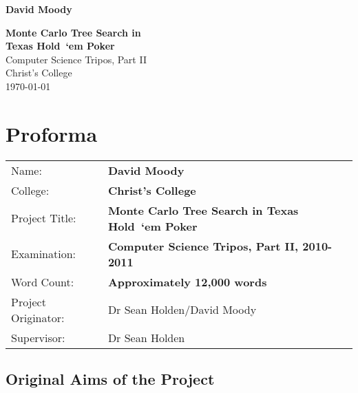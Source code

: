 \documentclass[12pt,twoside,notitlepage]{report}
\newcommand{\texas}{Texas Hold~`em\xspace}
\newcommand{\texasp}{\texas Poker\xspace}
\begin{document}


\pagestyle{empty}

\hfill{\LARGE \bf David Moody}

\vspace*{55mm}
\begin{center}
\Huge
{\bf Monte Carlo Tree Search in \\\texasp} \\
\vspace*{5mm}
Computer Science Tripos, Part II \\
\vspace*{5mm}
Christ's College \\
\vspace*{5mm}
\today  %
\end{center}

\cleardoublepage



\setcounter{page}{1}
\pagestyle{plain}

\chapter*{Proforma}

\begin{tabular}{ll}

Name:				& \bf David Moody \\
College:			& \bf Christ's College \\
Project Title:		& \bf Monte Carlo Tree Search in \texasp \\
Examination:		& \bf Computer Science Tripos, Part II, 2010-2011 \\
Word Count:			& \bf Approximately 12,000 words \\
Project Originator:	& Dr Sean Holden/David Moody \\
Supervisor:			& Dr Sean Holden \\ 

\end{tabular}



\section*{Original Aims of the Project}
\end{document}
